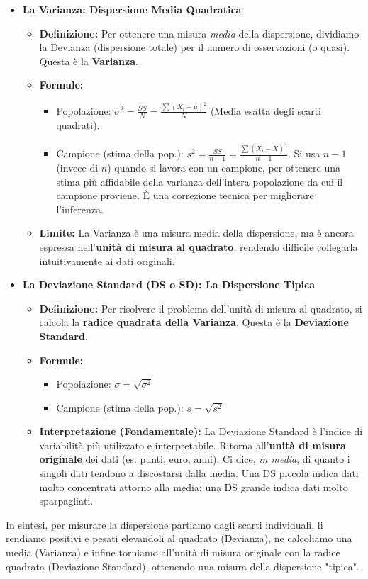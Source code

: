 \documentclass[12pt, a4paper]{article}
\newcommand{\popmean}{\mu} %
\newcommand{\samplemean}{\bar{X}} %
\newcommand{\popvar}{\sigma^2} %
\newcommand{\samplevar}{s^2} %
\newcommand{\popsd}{\sigma} %
\newcommand{\samplesd}{s} %
\begin{document}
\begin{itemize}
    \item \textbf{La Varianza: Dispersione Media Quadratica}
        \begin{itemize}
            \item \textbf{Definizione:} Per ottenere una misura \textit{media} della dispersione, dividiamo la Devianza (dispersione totale) per il numero di osservazioni (o quasi). Questa è la \textbf{Varianza}.
            \item \textbf{Formule:}
                \begin{itemize}
                    \item Popolazione: $\popvar = \frac{SS}{N} = \frac{\sum (X_i - \popmean)^2}{N}$ (Media esatta degli scarti quadrati).
                    \item Campione (stima della pop.): $\samplevar = \frac{SS}{n-1} = \frac{\sum (X_i - \samplemean)^2}{n-1}$. Si usa $n-1$ (invece di $n$) quando si lavora con un campione, per ottenere una stima più affidabile della varianza dell'intera popolazione da cui il campione proviene. È una correzione tecnica per migliorare l'inferenza.
                \end{itemize}
            \item \textbf{Limite:} La Varianza è una misura media della dispersione, ma è ancora espressa nell'\textbf{unità di misura al quadrato}, rendendo difficile collegarla intuitivamente ai dati originali.
        \end{itemize}

    \item \textbf{La Deviazione Standard (DS o SD): La Dispersione Tipica}
        \begin{itemize}
            \item \textbf{Definizione:} Per risolvere il problema dell'unità di misura al quadrato, si calcola la \textbf{radice quadrata della Varianza}. Questa è la \textbf{Deviazione Standard}.
            \item \textbf{Formule:}
                \begin{itemize}
                    \item Popolazione: $\popsd = \sqrt{\popvar}$
                    \item Campione (stima della pop.): $\samplesd = \sqrt{\samplevar}$
                \end{itemize}
            \item \textbf{Interpretazione (Fondamentale):} La Deviazione Standard è l'indice di variabilità più utilizzato e interpretabile. Ritorna all'\textbf{unità di misura originale} dei dati (es. punti, euro, anni). Ci dice, \textit{in media}, di quanto i singoli dati tendono a discostarsi dalla media. Una DS piccola indica dati molto concentrati attorno alla media; una DS grande indica dati molto sparpagliati.
        \end{itemize}
\end{itemize}
In sintesi, per misurare la dispersione partiamo dagli scarti individuali, li rendiamo positivi e pesati elevandoli al quadrato (Devianza), ne calcoliamo una media (Varianza) e infine torniamo all'unità di misura originale con la radice quadrata (Deviazione Standard), ottenendo una misura della dispersione "tipica".
\end{document}
